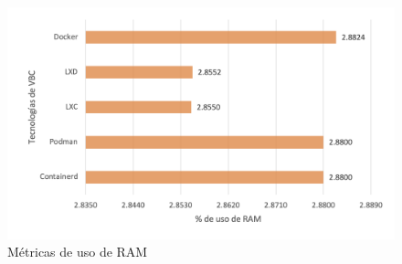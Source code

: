 \begin{figure}[H]
    \centering
    \includegraphics[width=\textwidth] {tablas-images/cp4/ram.png}
    \caption{Métricas de uso de RAM}\label{fig:tabla-metricas-ram}
\end{figure}